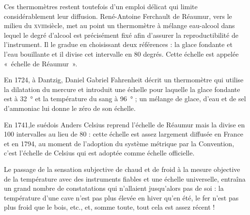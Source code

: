 	Ces thermomètres restent toutefois d'un emploi délicat qui limite considérablement leur diffusion.	René-Antoine Ferchault de Réaumur, vers le milieu du \textsc{xviii}\ieme siècle, met au point un thermomètre à mélange eau-alcool dans lequel le degré d'alcool est précisément fixé afin d'assurer la reproductibilité de l'instrument. Il le gradue en choisissant deux références : la glace fondante et l'eau bouillante et il divise cet intervalle en 80 degrés. Cette échelle est appelée «~échelle de Réaumur~». 
	
	En 1724, à Dantzig, Daniel Gabriel Fahrenheit décrit un thermomètre qui utilise la dilatation du mercure et introduit une échelle pour laquelle la glace fondante est à \SI{32}{\degree} et la température du sang à \SI{96}{\degree} ; un mélange de glace, d'eau et de sel d'ammoniac lui donne le zéro de son échelle.
	
	En 1741,le suédois Anders Celsius reprend l'échelle de Réaumur mais la divise en 100 intervalles au lieu de 80 : cette échelle est assez largement diffusée en France et en 1794, au moment de l'adoption du système métrique par la Convention, c'est l'échelle de Celsius qui est adoptée comme échelle officielle.

	Le passage de la sensation subjective de chaud et de froid à la mesure objective de la température avec des instruments fiables et une échelle universelle, entraîna un grand nombre de constatations qui n'allaient jusqu'alors pas de soi : la température d'une cave n'est pas plus élevée en hiver qu'en été, le fer n'est pas plus froid que le bois, etc., et, somme toute, tout cela est assez récent !

\atendofhistorysection

